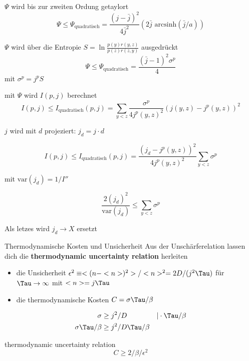 \documentclass[aspectratio=1610, 9pt]{beamer}
\begin{document}
\begin{frame}
  $\Psi$ wird bis zur zweiten Ordung getaylort
  \begin{equation*}
    \Psi \leq \Psi_\text{quadratisch} = \frac{(j- \bar{j})^2}{4 \bar{j}^2} \left( 2 \bar{j }  \text{ arcsinh}(\bar{j} / a )\right)
  \end{equation*}

  $\Psi$ wird über die Entropie $S = \ln\frac{p(y)r(y,z)}{p(z)r(z,y)}$ ausgedrückt
  \begin{equation*}
    \Psi \leq \Psi_\text{quadratisch} = \frac{(\bar{j} -1 )^2 \sigma^p }{4 } 
  \end{equation*}
  mit $\sigma^p = j^p S $
   
  mit $\Psi$ wird $I(p,j)$ berechnet
  \begin{equation*}
    I(p,j)  \leq I_\text{quadratisch} (p,j) = \sum_{y<z} \frac{\sigma^p }{4  j^p(y,z)^2} (j(y,z) - j^p(y,z))^2 
  \end{equation*}

  $j$ wird mit $d$ projeziert: $j_d = j\cdot d$

  \begin{equation*}
    I(p,j)  \leq I_\text{quadratisch} (p,j) = \frac{ (j_d - j^p(y,z))^2}{4  j^p(y,z)^2}  \sum_{y<z} \sigma^p 
  \end{equation*}

  mit $\text{var}(j_d) = 1 / I''$

  \begin{equation*}
      \frac{ 2(j_d)^2 }{\text{var}(j_d)} \leq \sum_{y<z} \sigma^p 
  \end{equation*}

  Als letzes wird $j_d \to  X $ ersetzt


\end{frame}



\begin{frame}{Thermodynamische Kosten und Unsicherheit}
  Aus der Unschärferelation lassen dich die \textbf{thermodynamic uncertainty relation} herleiten
  \begin{itemize}
    \item die Unsicherheit $\epsilon^2 \equiv <(n-<n>)^2> / <n>^2 = 2 D / (j^2 \Tau )$ für $\Tau \to \infty$ mit $<n>= j \Tau$
    \item die thermodynamische Kosten $C= \sigma \Tau / \beta$
  \end{itemize}
  \begin{align*}
    \sigma &\geq j^2 / D  &|\cdot \Tau / \beta \\
    \sigma  \Tau / \beta &\geq j^2 / D  \Tau / \beta & \\
  \end{align*}

  \begin{block}{thermodynamic uncertainty relation}
    \begin{equation*} 
      C \geq 2 / \beta / \epsilon^2 
    \end{equation*}
  \end{block}
\end{frame}
\end{document}
